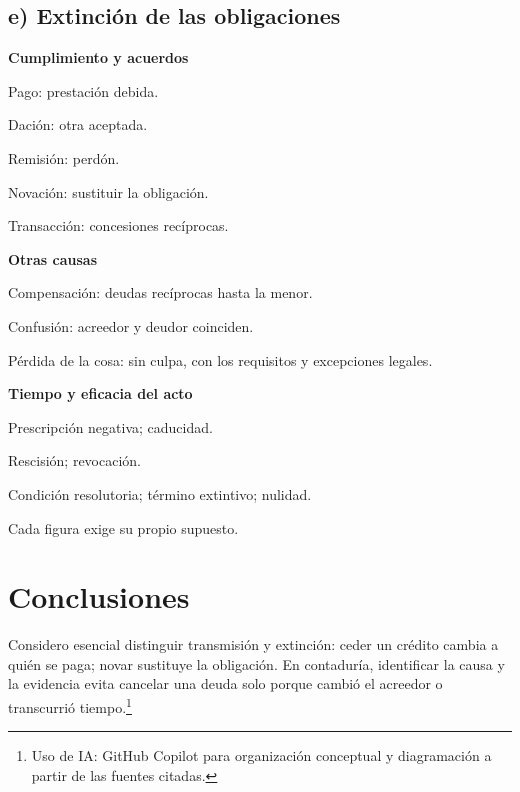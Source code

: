 {\subsection*{e) Extinción de las obligaciones}
{\textbf{Cumplimiento y acuerdos}\par Pago: prestación debida.\par Dación: otra aceptada.\par Remisión: perdón.\par Novación: sustituir la obligación.\par Transacción: concesiones recíprocas.}
{\textbf{Otras causas}\par Compensación: deudas recíprocas hasta la menor.\par Confusión: acreedor y deudor coinciden.\par Pérdida de la cosa: sin culpa, con los requisitos y excepciones legales.}
{\textbf{Tiempo y eficacia del acto}\par Prescripción negativa; caducidad.\par Rescisión; revocación.\par Condición resolutoria; término extintivo; nulidad.\par Cada figura exige su propio supuesto.}

\section{Conclusiones}
Considero esencial distinguir transmisión y extinción: ceder un crédito cambia a quién se paga; novar sustituye la obligación. En contaduría, identificar la causa y la evidencia evita cancelar una deuda solo porque cambió el acreedor o transcurrió tiempo.\footnote{Uso de IA: GitHub Copilot para organización conceptual y diagramación a partir de las fuentes citadas.}
\setlength{\bibitemsep}{0pt}
\renewcommand{\bibfont}{\footnotesize}
}
